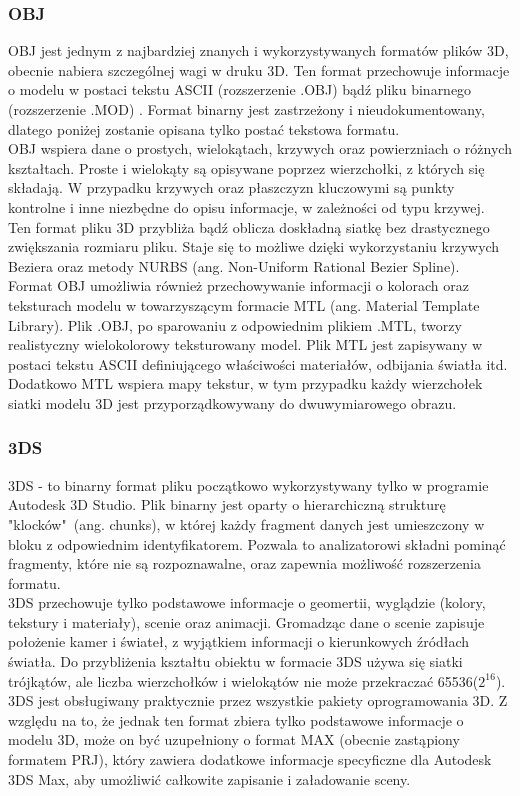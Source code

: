 \subsubsection{OBJ}
OBJ jest jednym z najbardziej znanych i wykorzystywanych formatów plików 3D, obecnie nabiera szczególnej wagi w druku 3D. Ten format przechowuje informacje o modelu w postaci tekstu ASCII (rozszerzenie .OBJ) bądź pliku binarnego (rozszerzenie .MOD) \cite{objinfo}.
Format binarny jest zastrzeżony i nieudokumentowany, dlatego poniżej zostanie opisana tylko postać tekstowa formatu. \\
OBJ wspiera dane o prostych, wielokątach, krzywych oraz powierzniach o różnych kształtach. Proste i wielokąty są opisywane poprzez wierzchołki, z których się składają. W przypadku krzywych oraz płaszczyzn kluczowymi są punkty kontrolne i inne niezbędne do opisu informacje, w zależności od typu krzywej. Ten format pliku 3D przybliża bądź oblicza doskładną siatkę bez drastycznego zwiększania rozmiaru pliku. Staje się to możliwe dzięki wykorzystaniu krzywych Beziera oraz metody NURBS (ang. Non-Uniform Rational Bezier Spline). \\
Format OBJ umożliwia również przechowywanie informacji o kolorach oraz teksturach modelu w towarzyszącym formacie MTL (ang. Material Template Library). Plik .OBJ, po sparowaniu z odpowiednim plikiem .MTL, tworzy realistyczny wielokolorowy teksturowany model. Plik MTL jest zapisywany w postaci tekstu ASCII definiującego właściwości materiałów, odbijania światła itd. Dodatkowo MTL wspiera mapy tekstur, w tym przypadku każdy wierzchołek siatki modelu 3D jest przyporządkowywany do dwuwymiarowego obrazu. 


\subsubsection{3DS}
3DS - to binarny format pliku początkowo wykorzystywany tylko w programie Autodesk 3D Studio. Plik binarny jest oparty o hierarchiczną strukturę "klocków"\ (ang. chunks), w której każdy fragment danych jest umieszczony w bloku z odpowiednim identyfikatorem. Pozwala to analizatorowi składni pominąć fragmenty, które nie są rozpoznawalne, oraz zapewnia możliwość rozszerzenia formatu. %
\\
3DS przechowuje tylko podstawowe informacje o geomertii, wyglądzie (kolory, tekstury i materiały), scenie oraz animacji. Gromadząc dane o scenie zapisuje położenie kamer i świateł, z wyjątkiem informacji o kierunkowych źródłach światła. Do przybliżenia kształtu obiektu w formacie 3DS używa się siatki trójkątów, ale liczba wierzchołków i wielokątów nie może przekraczać 65536($2^{16}$). 3DS jest obsługiwany praktycznie przez wszystkie pakiety oprogramowania 3D. Z względu na to, że jednak ten format zbiera tylko podstawowe informacje o modelu 3D, może on być uzupełniony o format MAX (obecnie zastąpiony formatem PRJ), który zawiera dodatkowe informacje specyficzne dla Autodesk 3DS Max, aby umożliwić całkowite zapisanie i załadowanie sceny.

